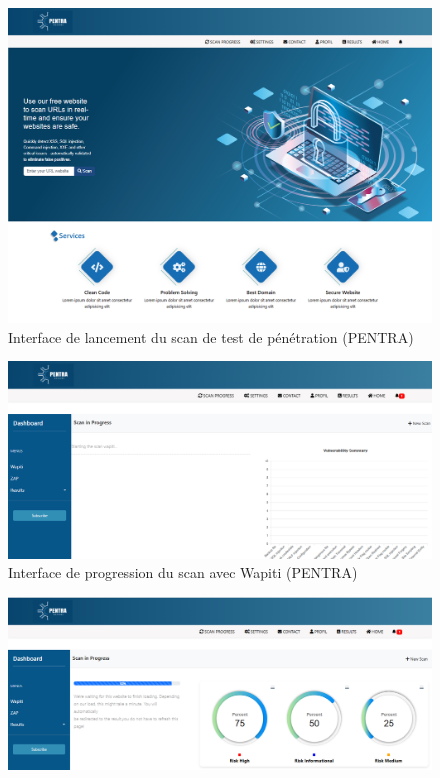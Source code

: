 \begin{justify}
\begin{enumerate}
        \begin{figure}[H]
            \centering
            \includegraphics[width=0.8\linewidth]{Annexe/PENTRA-V1/4.png}
            \caption{\centering Interface de lancement du scan de test de pénétration (PENTRA)}
            \label{fig:PENTRA-V1-4}
        \end{figure}
        \vspace{-0.3cm}
        \begin{figure}[H]
            \centering
            \includegraphics[width=0.8\linewidth]{Annexe/PENTRA-V1/5.PNG}
            \caption{\centering Interface de progression du scan avec Wapiti (PENTRA)}
            \label{fig:PENTRA-V1-5}
        \end{figure}
        \vspace{-0.3cm}
        \begin{figure}[H]
            \centering
            \includegraphics[width=0.8\linewidth]{Annexe/PENTRA-V1/6.PNG}

\end{figure}
\end{enumerate}
\end{justify}
